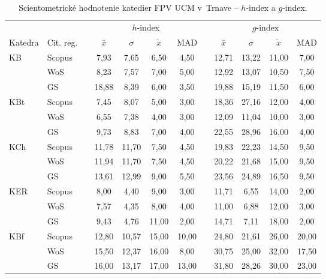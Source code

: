 \begin{table}
  \centering\small
  \caption[Hodnotenie FPV -- $h$-index a $g$-index]%
  {Scientometrické hodnotenie katedier FPV UCM v~Trnave -- $h$-index a $g$-index.}
  \label{tab:3-staff.results}
  \begin{tabularx}{\textwidth}{XXp{1ex}ccccp{1ex}cccc}
    \toprule
    & & & \multicolumn{4}{c}{$h$-index} & & \multicolumn{4}{c}{$g$-index} \\
    \cmidrule{4-7}\cmidrule{9-12}
    Katedra & Cit. reg. & & $\bar{x}$ & $\sigma$ & $\tilde{x}$ & MAD & & $\bar{x}$ & $\sigma$ & $\tilde{x}$ & MAD \\
    \midrule
    KB   & Scopus & & 7,93  & 7,65  & 6,50  & 4,50  & & 12,71 & 13,22 & 11,00 & 7,00  \\
         & WoS    & & 8,23  & 7,57  & 7,00  & 5,00  & & 12,92 & 13,07 & 10,50 & 7,50  \\
         & GS     & & 18,88 & 8,39  & 6,00  & 3,50  & & 19,88 & 15,19 & 11,50 & 6,00  \\[1ex]
    KBt  & Scopus & & 7,45  & 8,07  & 5,00  & 3,00  & & 18,36 & 27,16 & 12,00 & 4,00  \\
         & WoS    & & 6,55  & 7,38  & 4,00  & 3,00  & & 12,09 & 11,04 & 10,00 & 3,00  \\
         & GS     & & 9,73  & 8,83  & 7,00  & 4,00  & & 22,55 & 28,96 & 16,00 & 4,00  \\[1ex]
    KCh  & Scopus & & 11,78 & 11,70 & 7,50  & 4,50  & & 19,83 & 22,23 & 14,50 & 9,50  \\
         & WoS    & & 11,94 & 11,70 & 7,50  & 4,50  & & 20,22 & 21,68 & 15,00 & 9,50  \\
         & GS     & & 13,61 & 12,99 & 9,00  & 5,50  & & 23,56 & 24,89 & 16,50 & 9,50  \\[1ex]
    KER  & Scopus & & 8,00  & 4,40  & 9,00  & 3,00  & & 11,71 & 6,55  & 14,00 & 2,00  \\
         & WoS    & & 7,57  & 4,35  & 8,00  & 4,00  & & 11,00 & 6,88  & 12,00 & 3,00  \\
         & GS     & & 9,43  & 4,76  & 11,00 & 2,00  & & 14,71 & 7,11  & 18,00 & 2,00  \\[1ex]
    KBf  & Scopus & & 12,80 & 10,57 & 15,00 & 10,00 & & 24,80 & 21,61 & 26,00 & 20,00 \\
         & WoS    & & 15,50 & 12,37 & 16,00 & 8,00  & & 30,75 & 25,00 & 32,00 & 17,50 \\
         & GS     & & 16,00 & 13,17 & 17,00 & 13,00 & & 31,80 & 28,26 & 30,00 & 23,00 \\[1ex]

\end{tabularx}
\end{table}
